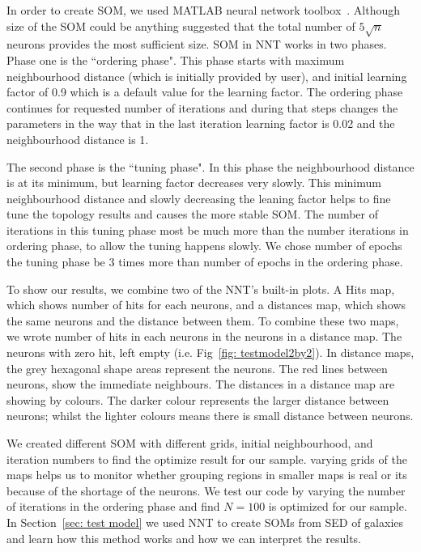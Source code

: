      In order to create SOM, we used {\tiny MATLAB} neural network toolbox~\citep[NNT,][]{matlabtolbox}.
     Although size of the SOM could be anything \cite{Vesanto05} suggested that the total number of  $5\sqrt{n}$ neurons provides the most sufficient size.
     SOM in {\tiny NNT} works in two phases. 
     Phase one is the ``ordering phase". 
     This phase starts with maximum neighbourhood distance (which is initially provided by user), and initial learning factor of 0.9 which is a default value for the learning factor. 
     The ordering phase continues for requested number of iterations and during that steps changes the parameters in the way that in the last iteration learning factor is 0.02 and the neighbourhood distance is 1.
     
     The second phase is the ``tuning phase".
     In this phase the neighbourhood distance is at its minimum, but learning factor decreases very slowly.
     This minimum neighbourhood distance and slowly decreasing the leaning factor helps to fine tune the topology results and causes the more stable SOM. 
     The number of iterations in this tuning phase most be much more than the number iterations in ordering phase, to allow the tuning happens slowly. 
     We chose number of epochs the tuning phase be 3 times more than number of epochs in the ordering phase.
     
     To show our results, we combine two of the {\tiny NNT}'s built-in plots. 
     A Hits map, which shows number of hits for each neurons, and a distances map, which shows the same neurons and the distance between them. 
     To combine these two maps, we wrote number of hits in each neurons in the neurons in a distance map.
     The neurons with zero hit, left empty  (i.e. Fig~\ref{fig: testmodel2by2}).
     In distance maps, the grey hexagonal shape areas represent the neurons.
     The red lines between neurons, show the immediate neighbours.
     The distances in a distance map are showing by colours.
     The darker colour represents the larger distance between neurons; whilst the lighter colours means there is small distance between neurons.
    
     We created different SOM with different grids, initial neighbourhood, and iteration numbers to find the optimize result for our sample.
     varying grids of the maps helps us to monitor whether grouping regions in smaller maps is real or its because of the shortage of the neurons.
     We test our code by varying the number of iterations in the ordering phase and find $N = 100$  is optimized for our sample.
     In Section~\ref{sec: test model} we used NNT to create SOMs from SED of galaxies and learn how this method works and how we can interpret the results.
   
